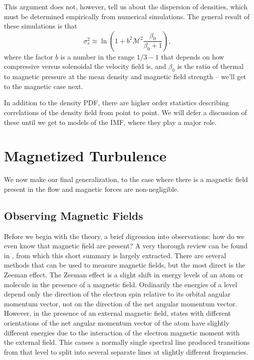 This argument does not, however, tell us about the dispersion of densities, which must be determined empirically from numerical simulations. The general result of these simulations \citep[e.g.,][]{federrath13b} is that
\begin{equation}
\sigma_s^2 \approx \ln \left(1 + b^2 \mathcal{M}^2 \frac{\beta_0}{\beta_0+1}\right),
\end{equation}
where the factor $b$ is a number in the range $1/3-1$ that depends on how compressive versus solenoidal the velocity field is, and $\beta_0$ is the ratio of thermal to magnetic pressure at the mean density and magnetic field strength -- we'll get to the magnetic case next.

In addition to the density PDF, there are higher order statistics describing correlations of the density field from point to point. We will defer a discussion of these until we get to models of the IMF, where they play a major role.

\section{Magnetized Turbulence}

We now make our final generalization, to the case where there is a magnetic field present in the flow and magnetic forces are non-negligible.

\subsection{Observing Magnetic Fields}

Before we begin with the theory, a brief digression into observations: how do we even know that magnetic field are present? A very thorough review can be found in \citet{crutcher12a}, from which this short summary is largely extracted. There are several methods that can be used to measure magnetic fields, but the most direct is the Zeeman effect. The Zeeman effect is a slight shift in energy levels of an atom or molecule in the presence of a magnetic field. Ordinarily the energies of a level depend only the direction of the electron spin relative to its orbital angular momentum vector, not on the direction of the net angular momentum vector. However, in the presence of an external magnetic field, states with different orientations of the net angular momentum vector of the atom have slightly different energies due to the interaction of the electron magnetic moment with the external field. This causes a normally single spectral line produced transitions from that level to split into several separate lines at slightly different frequencies.

